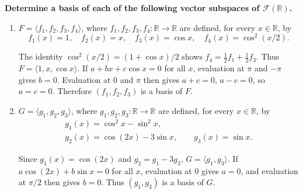 \providecommand{\rank}{\operatorname{r}}
\providecommand{\RR}{\mathbb R}
\providecommand{\CC}{\mathbb C}
\providecommand{\KK}{\mathbb K}

\setcounter{enumi}{85}
\item {\bfseries\boldmath
Determine a basis of each of the following vector subspaces of $\mathcal F(\RR)$.
}

\begin{enumerate}[label=\alph*)]

\item $F=\langle f_1,f_2,f_3,f_4\rangle$, where $f_1,f_2,f_3,f_4:\RR\to\RR$ are defined, for every $x\in\RR$, by
\[
f_1(x)=1,\quad f_2(x)=x,\quad f_3(x)=\cos x,\quad f_4(x)=\cos^2(x/2).
\]

\begin{answer}
The identity $\cos^2(x/2)=(1+\cos x)/2$ shows
$f_4=\frac12f_1+\frac12f_3$.
Thus $F=\langle1,x,\cos x\rangle$.
If $a+bx+c\cos x=0$ for all $x$, evaluation at $\pi$ and $-\pi$ gives $b=0$.
Evaluation at $0$ and $\pi$ then gives $a+c=0$, $a-c=0$, so $a=c=0$.
Therefore $(f_1,f_2,f_3)$ is a basis of $F$.
\end{answer}

\item $G=\langle g_1,g_2,g_3\rangle$, where $g_1,g_2,g_3:\RR\to\RR$ are defined, for every $x\in\RR$, by
\[
\begin{gathered}g_1(x)=\cos^2x-\sin^2x,\\g_2(x)=\cos(2x)-3\sin x,\qquad g_3(x)=\sin x.\end{gathered}
\]

\begin{answer}
Since $g_1(x)=\cos(2x)$ and $g_2=g_1-3g_3$,
$G=\langle g_1,g_3\rangle$.
If $a\cos(2x)+b\sin x=0$ for all $x$, evaluation at $0$ gives $a=0$,
and evaluation at $\pi/2$ then gives $b=0$.
Thus $(g_1,g_3)$ is a basis of $G$.
\end{answer}
\end{enumerate}
